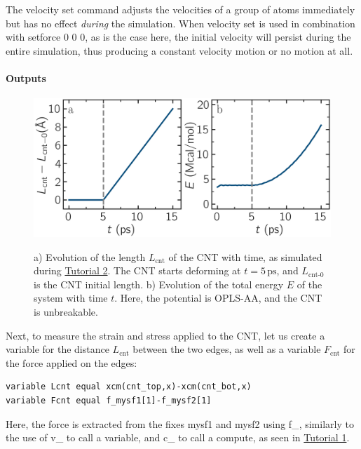 \documentclass[9pt,tutorial]{livecoms}
\newcommand{\lmpcmd}[1]{\colorbox{listing}{\textcolor{command}{\small{#1}}}} %
\newcommand{\lmpcmdnote}[1]{\colorbox{note_listing}{\textcolor{command}{\small{#1}}}} %
\begin{document}
\begin{note}
  The \lmpcmdnote{velocity set} command adjusts the velocities of
  a group of atoms immediately but has no effect
  \emph{during} the simulation.  When \lmpcmdnote{velocity set} is used
  in combination with \lmpcmdnote{setforce 0 0 0}, as is the case here, the
  initial velocity will persist during the entire simulation, thus producing
  a constant velocity motion or no motion at all.
\end{note}

\paragraph{Outputs}

\begin{figure}
\centering
\includegraphics[width=\linewidth]{CNT-unbreakable-length-energy}\\[-2ex]
\caption{a) Evolution of the length $L_\text{cnt}$ of the CNT with time,
as simulated during \hyperref[carbon-nanotube-label]{Tutorial 2}.
The CNT starts deforming at $t = 5\,\text{ps}$, and $L_\text{cnt-0}$ is the
CNT initial length.  b) Evolution of the total energy $E$ of the system
with time $t$.  Here, the potential is OPLS-AA, and the CNT is unbreakable.}
\label{fig:CNT-unbreakable-LE}
\end{figure}

Next, to measure the strain and stress applied to the CNT, let us create a
variable for the distance $L_\text{cnt}$ between the two edges,
as well as a variable $F_\text{cnt}$ for the force applied on the edges:
\begin{lstlisting}
variable Lcnt equal xcm(cnt_top,x)-xcm(cnt_bot,x)
variable Fcnt equal f_mysf1[1]-f_mysf2[1]
\end{lstlisting}
Here, the force is extracted from the fixes \lmpcmd{mysf1} and \lmpcmd{mysf2}
using \lmpcmd{f\_}, similarly to the use of \lmpcmd{v\_} to call a variable,
and \lmpcmd{c\_} to call a compute, as seen in \hyperref[lennard-jones-label]{Tutorial 1}.
\end{document}
